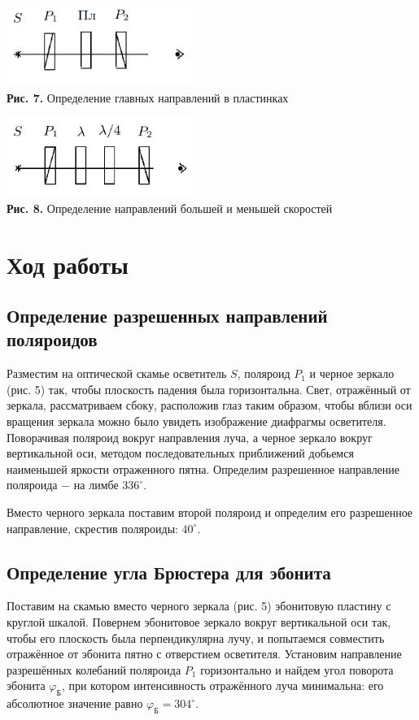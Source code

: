 \documentclass[a4paper,12pt]{article} %
\begin{document}
\begin{center}
\includegraphics[width=0.45\textwidth]{4.7.3_7.png}\\
\textbf{Рис. 7.} Определение главных направлений в пластинках \\
\end{center}

\begin{center}
\includegraphics[width=0.45\textwidth]{4.7.3_8.png}\\
\textbf{Рис. 8.} Определение направлений большей и меньшей скоростей \\
\end{center}

\section{Ход работы}
\subsection{Определение разрешенных направлений поляроидов}
\hfill \break Разместим на оптической скамье осветитель $S$, поляроид $P_1$ и черное зеркало (рис. 5) так, чтобы плоскость падения была горизонтальна. Свет, отражённый от зеркала, рассматриваем сбоку, расположив глаз таким образом, чтобы вблизи оси вращения зеркала можно было увидеть изображение диафрагмы осветителя. Поворачивая поляроид вокруг направления луча, а черное зеркало вокруг вертикальной оси, методом последовательных приближений добьемся наименьшей яркости отраженного пятна. Определим разрешенное направление поляроида $-$ на лимбе $336^\circ$. 

\hfill \break Вместо черного зеркала поставим второй поляроид и определим его разрешенное направление, скрестив поляроиды: $40^\circ$.

\subsection{Определение угла Брюстера для эбонита}
\hfill \break Поставим на скамью вместо черного зеркала (рис. 5) эбонитовую пластину с круглой шкалой. Повернем эбонитовое зеркало вокруг вертикальной оси так, чтобы его плоскость была перпендикулярна лучу, и попытаемся совместить отражённое от эбонита пятно с отверстием осветителя. Установим направление разрешённых колебаний поляроида $P_1$ горизонтально и найдем угол поворота эбонита $\varphi_{\text{Б}}$, при котором интенсивность отражённого луча минимальна: его абсолютное значение равно $\varphi_{\text{Б}} = 304^\circ$.
\end{document}
